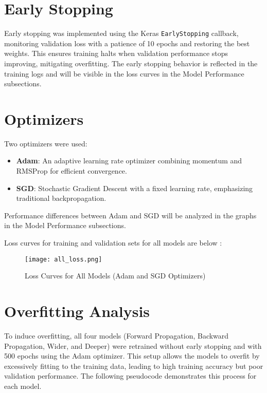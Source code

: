 \documentclass[a4paper,12pt]{article}
\begin{document}
\section*{Early Stopping}
Early stopping was implemented using the Keras \texttt{EarlyStopping} callback, monitoring validation loss with a patience of 10 epochs and restoring the best weights. This ensures training halts when validation performance stops improving, mitigating overfitting. The early stopping behavior is reflected in the training logs and will be visible in the loss curves in the Model Performance subsections.

\section*{Optimizers}
Two optimizers were used:
\begin{itemize}
    \item \textbf{Adam}: An adaptive learning rate optimizer combining momentum and RMSProp for efficient convergence.
    \item \textbf{SGD}: Stochastic Gradient Descent with a fixed learning rate, emphasizing traditional backpropagation.
\end{itemize}
Performance differences between Adam and SGD will be analyzed in the graphs in the Model Performance subsections.

Loss curves for training and validation sets for all models are below :

\begin{figure}[h]
    \centering
    \texttt{[image: all\_loss.png]}
    \caption{Loss Curves for All Models (Adam and SGD Optimizers)}
\end{figure}

\section*{Overfitting Analysis}
To induce overfitting, all four models (Forward Propagation, Backward Propagation, Wider, and Deeper) were retrained without early stopping and with 500 epochs using the Adam optimizer. This setup allows the models to overfit by excessively fitting to the training data, leading to high training accuracy but poor validation performance. The following pseudocode demonstrates this process for each model.
\end{document}
